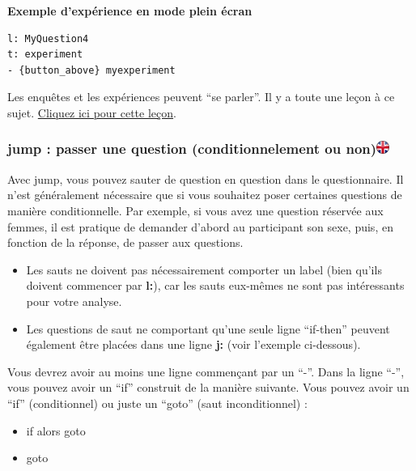 \documentclass[
]{book}
\providecommand{\tightlist}{%
  \setlength{\itemsep}{0pt}\setlength{\parskip}{0pt}}
\begin{document}
\textbf{Exemple d'expérience en mode plein écran}

\begin{verbatim}
l: MyQuestion4
t: experiment
- {button_above} myexperiment
\end{verbatim}

Les enquêtes et les expériences peuvent ``se parler''. Il y a toute une
leçon à ce sujet. \protect\hyperlink{s11}{Cliquez ici pour cette leçon}.

\hypertarget{jump-passer-une-question-conditionnelement-ou-nonukflag}{%
\subsubsection[jump : passer une question (conditionnelement ou
non)]{\texorpdfstring{jump : passer une question (conditionnelement ou
non)\href{https://www.psytoolkit.org/doc3.1.0/online-survey-syntax.html\#jump}{\protect\includegraphics{img/ukflag.png}}}{jump : passer une question (conditionnelement ou non)ukflag}}\label{jump-passer-une-question-conditionnelement-ou-nonukflag}}

Avec jump, vous pouvez sauter de question en question dans le
questionnaire. Il n'est généralement nécessaire que si vous souhaitez
poser certaines questions de manière conditionnelle. Par exemple, si
vous avez une question réservée aux femmes, il est pratique de demander
d'abord au participant son sexe, puis, en fonction de la réponse, de
passer aux questions.

\begin{itemize}
\tightlist
\item
  Les sauts ne doivent pas nécessairement comporter un label (bien
  qu'ils doivent commencer par \textbf{l:}), car les sauts eux-mêmes ne
  sont pas intéressants pour votre analyse.
\item
  Les questions de saut ne comportant qu'une seule ligne ``if-then''
  peuvent également être placées dans une ligne \textbf{j:} (voir
  l'exemple ci-dessous).
\end{itemize}

Vous devrez avoir au moins une ligne commençant par un ``-''. Dans la
ligne ``-'', vous pouvez avoir un ``if'' construit de la manière
suivante. Vous pouvez avoir un ``if'' (conditionnel) ou juste un
``goto'' (saut inconditionnel) :

\begin{itemize}
\tightlist
\item
  if alors goto 
\item
  goto 
\end{itemize}
\end{document}
